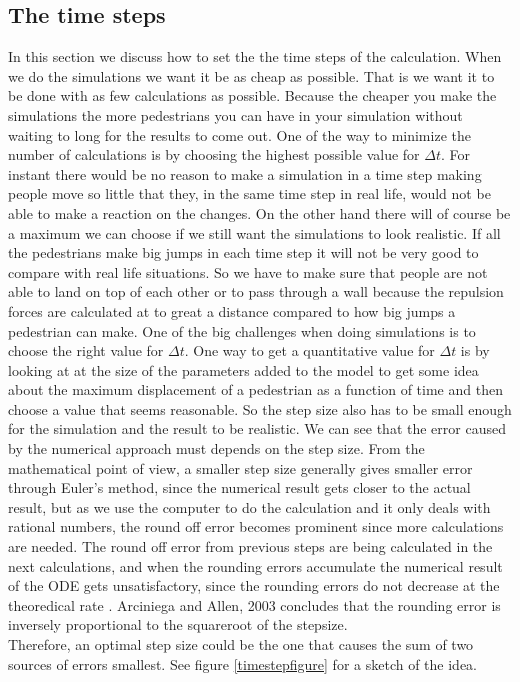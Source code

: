 \subsection{The time steps}
\label{sec:timestep}
In this section we discuss how to set the the time steps of the calculation.
When we do the simulations we want it be as cheap as possible. That is we 
want it to be done with as few calculations as possible. Because the cheaper 
you make the simulations the more pedestrians you can have in your simulation 
without waiting to long for the results to come out. One of the way to minimize 
the number of calculations is by choosing the highest possible value for 
$\Delta t$. For instant there would be no reason to make a simulation in a 
time step making people move so little that they, in the same time step in 
real life, would not be able to make a reaction on the changes. On the other 
hand there will of course be a maximum we can choose if we still want the simulations to 
look realistic. If all the pedestrians make big jumps in each time step it will not be very 
good to compare with real life situations. So we have to make sure that people are not able 
to land on top of each other or to pass through a wall because the repulsion forces are 
calculated at to great a distance compared to how big jumps a pedestrian can make.
One of the big challenges when doing simulations is to choose the right value for $\Delta t$. 
One way to get a quantitative value for $\Delta t$ is by looking at at the size of the parameters 
added to the model to get some idea about the maximum displacement of a pedestrian as a function 
of time and then choose a value that seems reasonable.
So the step size also has to be small enough for the simulation and the result to be realistic.
We can see that the error caused by the numerical approach must depends on the step size.
From the mathematical point of view, a smaller step size generally gives smaller error through
Euler's method, since the numerical result gets closer to the actual result, but 
as we use the computer to do the calculation and it only deals with rational numbers, the 
round off error becomes prominent since more calculations are needed.
The round off error from previous steps are being calculated in the next calculations, and when the rounding errors accumulate  
the numerical result of the ODE gets unsatisfactory, since the rounding errors do not decrease at the theoredical rate \cite{RoundingError}.
Arciniega and Allen, 2003 concludes that the rounding error is inversely proportional to the squareroot of the stepsize.
\\
Therefore, an optimal step size could be the one that causes 
the sum of two sources of errors smallest. See figure \ref{timestepfigure} for a sketch of the
idea.



